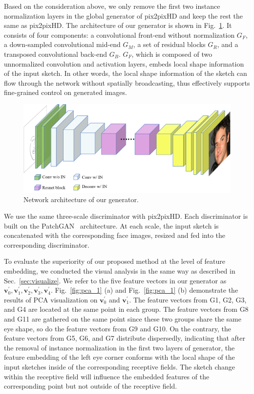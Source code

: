 \documentclass[10pt,twocolumn,letterpaper]{article}
\begin{document}
Based on the consideration above, we only remove the first two instance normalization layers in the global generator of pix2pixHD and keep the rest the same as pix2pixHD. 
The architecture of our generator is shown in Fig.~\ref{fig:our_generator}. 
It consists of four components: a convolutional front-end without normalization $G_F$, a down-sampled convolutional mid-end $G_M$, a set of residual blocks $G_R$, and a transposed convolutional back-end $G_B$.  
$G_F$, which is composed of two unnormalized convolution and activation layers, embeds local shape information of the input sketch.
In other words, the local shape information of the sketch can flow through the network without spatially broadcasting, thus effectively supports fine-grained control on generated images. 

\begin{figure}[htbp]
	\centering
	\includegraphics[width=\columnwidth]{our_model_G.png}
	\caption{Network architecture of our generator. }
	\label{fig:our_generator}
\end{figure}

We use the same three-scale discriminator with pix2pixHD. 
Each discriminator is built on the PatchGAN~\cite{pix2pix} architecture. 
At each scale, the input sketch is concatenated with the corresponding face images, resized and fed into the corresponding discriminator.
 
 
To evaluate the superiority of our proposed method at the level of feature embedding, we conducted the visual analysis in the same way as described in Sec.~\ref{sec:visualize}.
We refer to the five feature vectors in our generator as $\boldsymbol{v}_0^{'},\boldsymbol{v}_1^{'},\boldsymbol{v}_2^{'},\boldsymbol{v}_3^{'},\boldsymbol{v}_4^{'}$.
%
Fig.~\ref{fig:pca_1} (a) and Fig.~\ref{fig:pca_1} (b) demonstrate the results of PCA visualization on $\boldsymbol{v}_0^{'}$ and $\boldsymbol{v}_1^{'}$. 
The feature vectors from G1, G2, G3, and G4 are located at the same point in each group. The feature vectors from G8 and G11 are gathered on the same point since these two groups share the same eye shape, so do the feature vectors from G9 and G10.
On the contrary, the feature vectors from G5, G6, and G7 distribute dispersedly, indicating that after the removal of instance normalization in the first two layers of generator, the feature embedding of the left eye corner conforms with the local shape of the input sketches inside of the corresponding receptive fields. 
The sketch change within the receptive field will influence the embedded features of the corresponding point but not outside of the receptive field.
\end{document}
